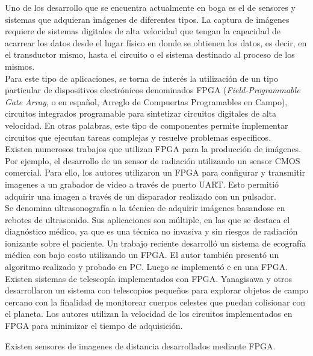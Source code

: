 Uno de los desarrollo que se encuentra actualmente en boga es el de sensores y sistemas que adquieran imágenes de diferentes tipos. La captura de imágenes requiere de sistemas digitales de alta velocidad que tengan la capacidad de acarrear los datos desde el lugar físico en donde se obtienen los datos, es decir, en el transductor mismo, hasta el circuito o el sistema destinado al proceso de los mismos.\\

Para este tipo de aplicaciones, se torna de interés la utilización de un tipo particular de dispositivos electrónicos denominados FPGA ({\it Field-Programmable Gate Array}, o en español, Arreglo de Compuertas Programables en Campo), circuitos integrados programable para sintetizar circuitos digitales de alta velocidad. En otras palabras, este tipo de componentes permite implementar circuitos que ejecutan tareas complejas y resuelve problemas específicos.\\

Existen numerosos trabajos que utilizan FPGA para la producción de imágenes. Por ejemplo, el desarrollo de un sensor de radiación utilizando un sensor CMOS comercial. Para ello, los autores utilizaron un FPGA para configurar y transmitir imagenes a un grabador de video a través de puerto UART. Esto permitió adquirir una imagen a través de un disparador realizado con un pulsador\cite{Perez2017}.\\

Se denomina ultrasonografía a la técnica de adquirir imágenes basandose en rebotes de ultrasonido. Sus aplicaciones son múltiple, en las que se destaca el diagnóstico médico, ya que es una técnica no invasiva y sin riesgos de radiación ionizante sobre el paciente. Un trabajo reciente desarrolló un sistema de ecografía médica con bajo costo utilizando un FPGA\cite{biswas2018embedded}. El autor también presentó un algoritmo realizado y probado en PC. Luego se implementó e en una FPGA.\\

Existen sistemas de telescopía implementados con FPGA. Yanagisawa y otros desarrollaron un sistema con telescopios pequeños para explorar objetos de campo cercano con la finalidad de monitorear cuerpos celestes que puedan colisionar con el planeta\cite{Yanagisawa2018}. Los autores utilizan la velocidad de los circuitos implementados en FPGA para minimizar el tiempo de adquisición.

Existen sensores de imagenes de distancia desarrollados mediante FPGA\cite{Cui2018}.\\%

